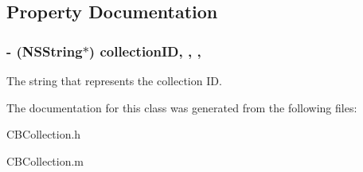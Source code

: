 \subsection{Property Documentation}
\hypertarget{interface_c_b_collection_a526d5990ac9db1922300bc55bc764fc1}{
\subsubsection[{collection\-I\-D}]{\setlength{\rightskip}{0pt plus 5cm}-\/ (N\-S\-String$\ast$) collection\-I\-D\hspace{0.3cm}{\ttfamily [read]}, {\ttfamily [write]}, {\ttfamily [nonatomic]}, {\ttfamily [strong]}}}\label{interface_c_b_collection_a526d5990ac9db1922300bc55bc764fc1}
The string that represents the collection I\-D. 

The documentation for this class was generated from the following files\-:\begin{DoxyCompactItemize}
\item 
C\-B\-Collection.\-h\item 
C\-B\-Collection.\-m\end{DoxyCompactItemize}
